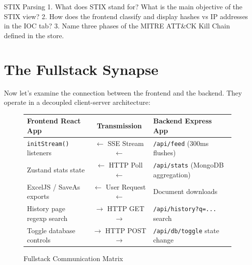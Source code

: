 \documentclass[11pt,a4paper]{report}
\begin{document}
\begin{activerecall}{STIX Parsing}
  1. What does STIX stand for? What is the main objective of the STIX view?
  2. How does the frontend classify and display hashes vs IP addresses in the IOC tab?
  3. Name three phases of the MITRE ATT\&CK Kill Chain defined in the store.
\end{activerecall}

\newpage

\chapter{The Fullstack Synapse}

Now let's examine the connection between the frontend and the backend. They operate in a decoupled client-server architecture:

\begin{figure}[H]
  \centering
  \small
  \begin{tabular}{|p{6.5cm}|c|p{6.5cm}|}
    \hline
    \textbf{Frontend React App} & \textbf{Transmission} & \textbf{Backend Express App} \\ \hline
    \texttt{initStream()} listeners & $\leftarrow$ SSE Stream $\leftarrow$ & \texttt{/api/feed} (300ms flushes) \\ \hline
    Zustand stats state & $\leftarrow$ HTTP Poll $\leftarrow$ & \texttt{/api/stats} (MongoDB aggregation) \\ \hline
    ExcelJS / SaveAs exports & $\leftarrow$ User Request $\leftarrow$ & Document downloads \\ \hline
    History page regexp search & $\rightarrow$ HTTP GET $\rightarrow$ & \texttt{/api/history?q=...} search \\ \hline
    Toggle database controls & $\rightarrow$ HTTP POST $\rightarrow$ & \texttt{/api/db/toggle} state change \\ \hline
  \end{tabular}
  \caption{Fullstack Communication Matrix}
\end{figure}
\end{document}
